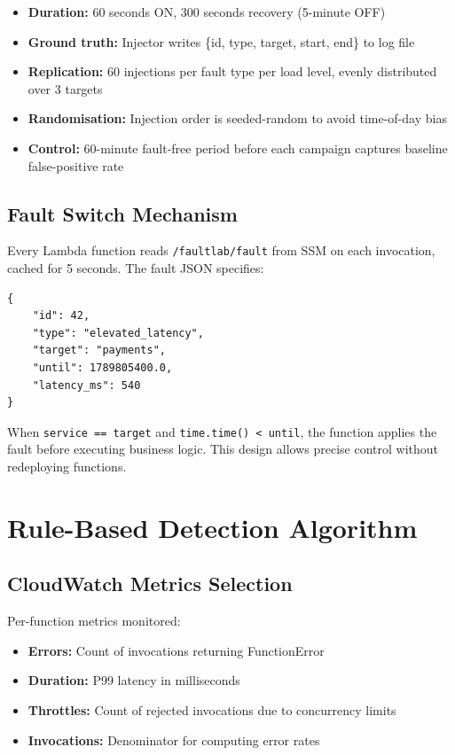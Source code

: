 \begin{itemize}
    \item \textbf{Duration:} 60 seconds ON, 300 seconds recovery (5-minute OFF)
    \item \textbf{Ground truth:} Injector writes \{id, type, target, start, end\} to log file
    \item \textbf{Replication:} 60 injections per fault type per load level, evenly distributed over 3 targets
    \item \textbf{Randomisation:} Injection order is seeded-random to avoid time-of-day bias
    \item \textbf{Control:} 60-minute fault-free period before each campaign captures baseline false-positive rate
\end{itemize}

\subsection{Fault Switch Mechanism}

Every Lambda function reads \texttt{/faultlab/fault} from SSM on each invocation, cached for 5 seconds. The fault JSON specifies:

\begin{verbatim}
{
    "id": 42,
    "type": "elevated_latency",
    "target": "payments",
    "until": 1789805400.0,
    "latency_ms": 540
}
\end{verbatim}

When \texttt{service == target} and \texttt{time.time() < until}, the function applies the fault before executing business logic. This design allows precise control without redeploying functions.

\section{Rule-Based Detection Algorithm}

\subsection{CloudWatch Metrics Selection}

Per-function metrics monitored:
\begin{itemize}
    \item \textbf{Errors:} Count of invocations returning FunctionError
    \item \textbf{Duration:} P99 latency in milliseconds
    \item \textbf{Throttles:} Count of rejected invocations due to concurrency limits
    \item \textbf{Invocations:} Denominator for computing error rates
\end{itemize}

